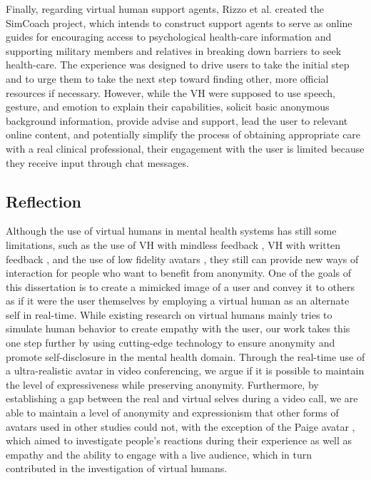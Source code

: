 Finally, regarding virtual human support agents, Rizzo et al. \cite{RIZ11} created the SimCoach project, which intends to construct support agents to serve as online guides for encouraging access to psychological health-care information and supporting military members and relatives in breaking down barriers to seek health-care. The experience was designed to drive users to take the initial step and to urge them to take the next step toward finding other, more official resources if necessary. However, while the VH were supposed to use speech, gesture, and emotion to explain their capabilities, solicit basic anonymous background information, provide advise and support, lead the user to relevant online content, and potentially simplify the process of obtaining appropriate care with a real clinical professional, their engagement with the user is limited because they receive input through chat messages.

\subsection{Reflection}
Although the use of virtual humans in mental health systems has still some limitations, such as the use of VH with mindless feedback \cite{GRA07}, VH with written feedback \cite{RIZ11}, and the use of low fidelity avatars \cite{LU21,KAN10, KAN10A, BAC19}, they still can provide new ways of interaction for people who want to benefit from anonymity. One of the goals of this dissertation is to create a mimicked image of a user and convey it to others as if it were the user themselves by employing a virtual human as an alternate self in real-time. While existing research on virtual humans mainly tries to simulate human behavior to create empathy with the user, our work takes this one step further by using cutting-edge technology to ensure anonymity and promote self-disclosure in the mental health domain. Through the real-time use of a ultra-realistic avatar in video conferencing, we argue if it is possible to maintain the level of expressiveness while preserving anonymity. Furthermore, by establishing a gap between the real and virtual selves during a video call, we are able to maintain a level of anonymity and expressionism that other forms of avatars used in other studies could not, with the exception of the Paige avatar \cite{ZEL19}, which aimed to investigate people's reactions during their experience as well as empathy and the ability to engage with a live audience, which in turn contributed in the investigation of virtual humans.